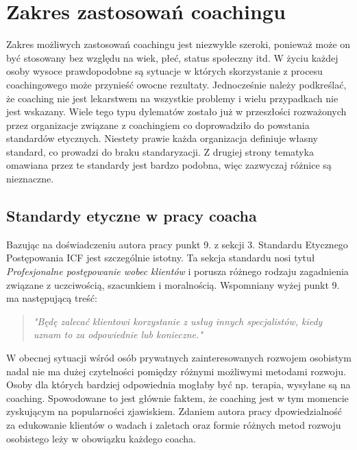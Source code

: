 
\section{Zakres zastosowań coachingu}


Zakres możliwych zastosowań coachingu jest niezwykle szeroki, ponieważ może on być stosowany bez względu na wiek, płeć, status społeczny itd.
W życiu każdej osoby wysoce prawdopodobne są sytuacje w których skorzystanie z procesu coachingowego może przynieść owocne rezultaty.
Jednocześnie należy podkreślać, że coaching nie jest lekarstwem na wszystkie problemy i wielu przypadkach nie jest wskazany.
Wiele tego typu dylematów zostało już w przeszłości rozważonych przez organizacje związane z coachingiem co doprowadziło do powstania
standardów etycznych. Niestety prawie każda organizacja definiuje własny standard, co prowadzi do braku standaryzacji. Z drugiej strony
tematyka omawiana przez te standardy jest bardzo podobna, więc zazwyczaj różnice są nieznaczne.

\subsection{Standardy etyczne w pracy coacha}
Bazując na doświadczeniu autora pracy punkt 9. z sekcji 3. Standardu Etycznego Postępowania ICF \cite{kodeksicf} jest szczególnie istotny.
Ta sekcja standardu nosi tytuł \emph{Profesjonalne postępowanie wobec klientów} i porusza różnego rodzaju zagadnienia związane
z uczciwością, szacunkiem i moralnością. Wspomniany wyżej punkt 9. ma następującą treść:
\begin{quote}
\centering
\emph{ "Będę zalecać klientowi korzystanie z usług innych specjalistów, kiedy uznam to za odpowiednie lub konieczne."}
\end{quote}
W obecnej sytuacji wśród osób prywatnych zainteresowanych rozwojem osobistym nadal nie ma dużej czytelności pomiędzy różnymi
możliwymi metodami rozwoju. Osoby dla których bardziej odpowiednia mogłaby być np. terapia, wysyłane są na coaching. Spowodowane
to jest głównie faktem, że coaching jest w tym momencie zyskującym na popularności zjawiskiem. Zdaniem autora pracy dpowiedzialność
za edukowanie klientów o wadach i zaletach oraz formie różnych metod rozwoju osobistego leży w obowiązku każdego coacha.

